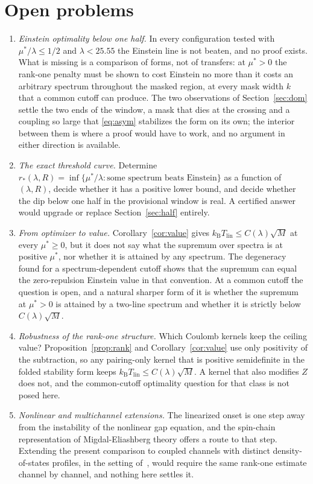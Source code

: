 \documentclass[11pt]{article}
\newcommand{\kb}{k_{\mathrm B}}
\newcommand{\Tlin}{T_{\mathrm{lin}}}
\newcommand{\muS}{\mu^{*}}
\theoremstyle{definition}
\theoremstyle{remark}
\begin{document}
\section{Open problems}\label{sec:open}

\begin{enumerate}[label=(\arabic*),leftmargin=2.2em]
\item \emph{Einstein optimality below one half.} In every configuration tested with
$\muS/\lambda\le1/2$ and $\lambda<25.55$ the Einstein line is not beaten, and no proof
exists. What is missing is a comparison of forms, not of transfers: at $\muS>0$ the
rank-one penalty must be shown to cost Einstein no more than it costs an arbitrary
spectrum throughout the masked region, at every mask width $k$ that a common cutoff can
produce. The two observations of Section~\ref{sec:dom} settle the two ends of the window,
a mask that dies at the crossing and a coupling so large that \eqref{eq:asym} stabilizes
the form on its own; the interior between them is where a proof would have to work, and no
argument in either direction is available.
\item \emph{The exact threshold curve.} Determine
$r_*(\lambda,R)=\inf\{\muS/\lambda:\text{some spectrum beats Einstein}\}$ as a function of
$(\lambda,R)$, decide whether it has a positive lower bound, and decide whether the dip
below one half in the provisional window is real. A certified answer would upgrade or
replace Section~\ref{sec:half} entirely.
\item \emph{From optimizer to value.} Corollary~\ref{cor:value} gives
$\kb\Tlin\le C(\lambda)\sqrt M$ at every $\muS\ge0$, but it does not say what the supremum
over spectra is at positive $\muS$, nor whether it is attained by any spectrum. The
degeneracy found for a spectrum-dependent cutoff shows that the supremum can equal the
zero-repulsion Einstein value in that convention. At a common cutoff the question is open,
and a natural sharper form of it is whether the supremum at $\muS>0$ is attained by a
two-line spectrum and whether it is strictly below $C(\lambda)\sqrt M$.
\item \emph{Robustness of the rank-one structure.} Which Coulomb kernels keep the ceiling
value? Proposition~\ref{prop:rank} and Corollary~\ref{cor:value} use only positivity of the
subtraction, so any pairing-only kernel that is positive semidefinite in the folded
stability form keeps $\kb\Tlin\le C(\lambda)\sqrt M$. A kernel that also modifies $Z$ does
not, and the common-cutoff optimality question for that class is not posed here.
\item \emph{Nonlinear and multichannel extensions.} The linearized onset is one step away
from the instability of the nonlinear gap equation, and the spin-chain representation of
Migdal-Eliashberg theory offers a route to that step. Extending the present comparison to
coupled channels with distinct density-of-states profiles, in the setting
of~\cite{univglue,optimum,anisosharp,capstone}, would require the same rank-one estimate
channel by channel, and nothing here settles it.
\end{enumerate}
\end{document}
